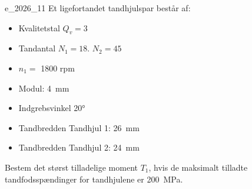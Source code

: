 \newcommand{\NoteType}{Exam 2026}
\newcommand{\CourseName}{Maskinelementer}
\newcommand{\CourseNumber}{290211U009}


    
    \newpage

    \begin{problemwithimage}{e_2026_1}{1}
      Et ligefortandet tandhjulspar består af:
      \begin{itemize}
        \item Kvalitetstal $Q_v = 3$
        \item Tandantal $N_1 = 18$. $N_2 = 45$
        \item $n_1 = $ 1800 rpm
        \item Modul: \qty{4}{\mm}
        \item Indgrebsvinkel \ang{20} 
        \item Tandbredden Tandhjul 1: \qty{26}{\mm}
        \item Tandbredden Tandhjul 2: \qty{24}{\mm}
      \end{itemize}
      Bestem det størst tilladelige moment $T_1$, hvis de maksimalt tilladte tandfodsspændinger for tandhjulene er \qty{200}{\MPa}.
    \end{problemwithimage}

